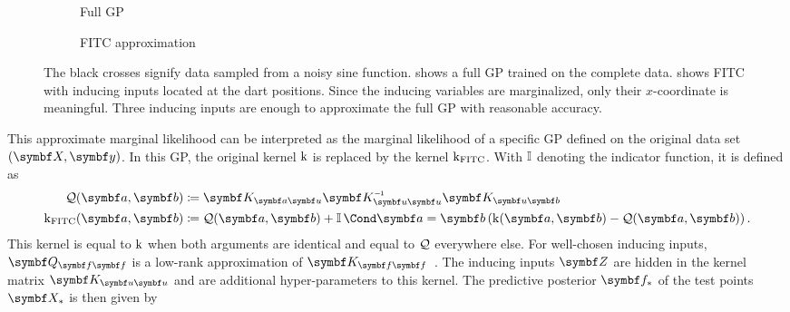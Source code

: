 \begin{figure}[tp]
    \begin{subfigure}{\halffigurewidth}
        \centering
        \caption{Full GP
            \label{fig:sparse_gp:spgp_example:gp}
        }
    \end{subfigure}
    \hfill
    \begin{subfigure}{\halffigurewidth}
        \centering
        \caption{
            FITC approximation
            \label{fig:sparse_gp:spgp_example:spgp}
        }
    \end{subfigure}
    \caption[FITC example]{
        The black crosses signify data sampled from a noisy sine function.
         shows a full GP trained on the complete data.
         shows FITC with inducing inputs located at the dart positions.
        Since the inducing variables are marginalized, only their $x$-coordinate is meaningful.
        Three inducing inputs are enough to approximate the full GP with reasonable accuracy.
        \label{fig:sparse_gp:spgp_example}
    }
\end{figure}
This approximate marginal likelihood can be interpreted as the marginal likelihood of a specific GP defined on the original data set $(\mat{X}, \mat{y})$.
In this GP, the original kernel $\operatorname{k}$ is replaced by the kernel $\operatorname{k}_{\text{FITC}}$.
With $\operatorname{\mathbb{I}}$ denoting the indicator function, it is defined as
\begin{align}
    \begin{split}
        \Qc(\mat{a}, \mat{b}) &\coloneqq \mat{K}_{\mat{a}\mat{u}} \mat{K}_{\mat{u}\mat{u}}\inv\mat{K}_{\mat{u}\mat{b}} \\
        \K_{\text{FITC}}(\mat{a}, \mat{b}) &\coloneqq \Qc(\mat{a}, \mat{b}) + \Indicator{\mat{a} = \mat{b}} \left( \K(\mat{a}, \mat{b}) - \Qc(\mat{a}, \mat{b}) \right).
    \end{split}
\end{align}
This kernel is equal to $\operatorname{k}$ when both arguments are identical and equal to $\mathcal{Q}$ everywhere else.
For well-chosen inducing inputs, $\mat{Q}_{\mat{f}\mat{f}}$ is a low-rank approximation of $\mat{K}_{\mat{f}\mat{f}}$~\parencite{snelson_flexible_2007}.
The inducing inputs $\mat{Z}$ are hidden in the kernel matrix $\mat{K}_{\mat{u}\mat{u}}$ and are additional hyper-parameters to this kernel.
The predictive posterior $\mat{f}_\ast$ of the test points $\mat{X}_\ast$ is then given by
